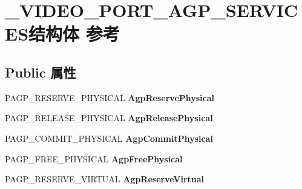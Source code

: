 \hypertarget{struct___v_i_d_e_o___p_o_r_t___a_g_p___s_e_r_v_i_c_e_s}{}\section{\+\_\+\+V\+I\+D\+E\+O\+\_\+\+P\+O\+R\+T\+\_\+\+A\+G\+P\+\_\+\+S\+E\+R\+V\+I\+C\+E\+S结构体 参考}
\label{struct___v_i_d_e_o___p_o_r_t___a_g_p___s_e_r_v_i_c_e_s}
\subsection*{Public 属性}
\begin{DoxyCompactItemize}
\item 
\mbox{\label{struct___v_i_d_e_o___p_o_r_t___a_g_p___s_e_r_v_i_c_e_s_a0f20cebf964fd9c4d19507eac9c58269}} 
P\+A\+G\+P\+\_\+\+R\+E\+S\+E\+R\+V\+E\+\_\+\+P\+H\+Y\+S\+I\+C\+AL {\bfseries Agp\+Reserve\+Physical}
\item 
\mbox{\label{struct___v_i_d_e_o___p_o_r_t___a_g_p___s_e_r_v_i_c_e_s_a9651880536f09ccdd10852b37bf07b8f}} 
P\+A\+G\+P\+\_\+\+R\+E\+L\+E\+A\+S\+E\+\_\+\+P\+H\+Y\+S\+I\+C\+AL {\bfseries Agp\+Release\+Physical}
\item 
\mbox{\label{struct___v_i_d_e_o___p_o_r_t___a_g_p___s_e_r_v_i_c_e_s_ac835505594c51ac56bc2b31c05202004}} 
P\+A\+G\+P\+\_\+\+C\+O\+M\+M\+I\+T\+\_\+\+P\+H\+Y\+S\+I\+C\+AL {\bfseries Agp\+Commit\+Physical}
\item 
\mbox{\label{struct___v_i_d_e_o___p_o_r_t___a_g_p___s_e_r_v_i_c_e_s_a8f04557c82b4631ecdba4ce22516bb5e}} 
P\+A\+G\+P\+\_\+\+F\+R\+E\+E\+\_\+\+P\+H\+Y\+S\+I\+C\+AL {\bfseries Agp\+Free\+Physical}
\item 
\mbox{\label{struct___v_i_d_e_o___p_o_r_t___a_g_p___s_e_r_v_i_c_e_s_a63b88c1a4f4997f359bc51bbd69e16e9}} 
P\+A\+G\+P\+\_\+\+R\+E\+S\+E\+R\+V\+E\+\_\+\+V\+I\+R\+T\+U\+AL {\bfseries Agp\+Reserve\+Virtual}
\item 

\end{DoxyCompactItemize}
